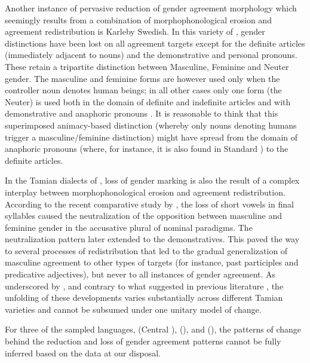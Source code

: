 \documentclass[output=collectionpaper]{langsci/langscibook}
\begin{document}
Another instance of pervasive reduction of gender agreement morphology which seemingly results from a combination of morphophonological erosion and agreement redistribution is Karleby Swedish. In this variety of , gender distinctions have been lost on all agreement targets except for the definite articles (immediately adjacent to nouns) and the demonstrative and personal pronouns. These retain a tripartite distinction between Masculine, Feminine and Neuter gender. The masculine and feminine forms are however used only when the controller noun denotes human beings; in all other cases only one form (the Neuter) is used both in the domain of definite and indefinite articles and with demonstrative and anaphoric pronouns \citep{Hulden1972,Hultman1894}. It is reasonable to think that this superimposed animacy-based distinction (whereby only nouns denoting humans trigger a masculine/feminine distinction) might have spread from the domain of anaphoric pronouns (where, for instance, it is also found in Standard ) to the definite articles.



In the Tamian dialects of , loss of gender marking is also the result of a complex interplay between morphophonological erosion and agreement redistribution. According to the recent comparative study by \citet{Waelchli2017}, the loss of short vowels in final syllables caused the neutralization of the opposition between masculine and feminine gender in the accusative plural of
nominal paradigms. The neutralization pattern later extended to the demonstratives. This paved the way to several processes of redistribution that led to the gradual generalization of masculine agreement to other types of targets (for instance, past participles and predicative adjectives), but never to all instances of gender agreement. As underscored by \citet{Waelchli2017}, and contrary to what suggested in previous literature \citep{Rudzite1980}, the unfolding of these developments varies substantially across different Tamian varieties and cannot be subsumed under one unitary model of change.



For three of the sampled languages, 
 (Central ), 
 (),
and 
 (),
the patterns of change behind the reduction and loss of gender agreement patterns cannot be fully inferred based on the data at our disposal.
\end{document}
